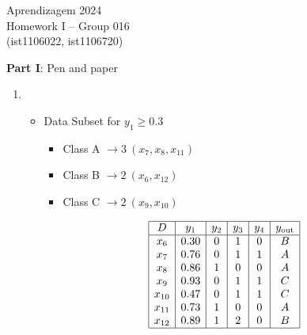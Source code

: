 \documentclass[12pt]{article}
\begin{document}
\center
Aprendizagem 2024\\
Homework I -- Group 016\\
(ist1106022, ist1106720)\vskip 1cm

\large{\textbf{Part I}: Pen and paper}\normalsize

\begin{enumerate}[leftmargin=\labelsep, label=\textbf{\arabic*.)}]
    \item \begin{itemize}
              \item Data Subset for \( y_1 \geq 0.3 \) \\
                    \vspace{0.5em}
                    \begin{minipage}{0.30\textwidth}
                        \begin{itemize}
                            \item Class A $\rightarrow 3 \ (x_7, x_8, x_{11})$
                            \item Class B $\rightarrow 2 \ (x_6, x_{12})$
                            \item Class C $\rightarrow 2 \ (x_9, x_{10})$
                        \end{itemize}
                    \end{minipage}
                    \begin{minipage}{0.45\textwidth}
                        \begin{center}
                            \[\begin{array}{|c|c|c|c|c|c|}
                                    \hline
                                    D      & y_1  & y_2 & y_3 & y_4 & y_{\text{out}} \\
                                    \hline
                                    x_6    & 0.30 & 0   & 1   & 0   & B              \\
                                    x_7    & 0.76 & 0   & 1   & 1   & A              \\
                                    x_8    & 0.86 & 1   & 0   & 0   & A              \\
                                    x_9    & 0.93 & 0   & 1   & 1   & C              \\
                                    x_{10} & 0.47 & 0   & 1   & 1   & C              \\
                                    x_{11} & 0.73 & 1   & 0   & 0   & A              \\
                                    x_{12} & 0.89 & 1   & 2   & 0   & B              \\
                                    \hline
                                \end{array}\]
                        \end{center}
                    \end{minipage}


\end{itemize}
\end{enumerate}
\end{document}

